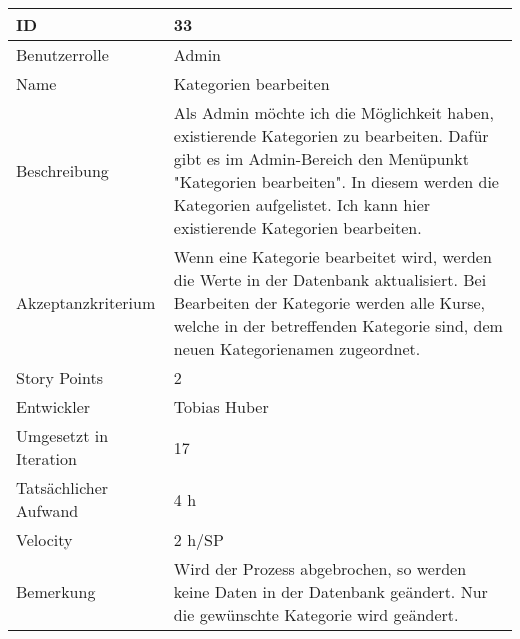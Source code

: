 \begin{tabularx}{\textwidth}{|p{}|X|}
	\hline
	ID & 33 \\
	\hline
	Benutzerrolle & Admin \\
	\hline
	Name & Kategorien bearbeiten\\
	\hline
	Beschreibung & Als Admin möchte ich die Möglichkeit haben, existierende Kategorien zu bearbeiten. Dafür gibt es im Admin-Bereich den Menüpunkt "Kategorien bearbeiten". In diesem werden die Kategorien aufgelistet. Ich kann hier existierende Kategorien bearbeiten. \\
	\hline
	Akzeptanzkriterium & Wenn eine Kategorie bearbeitet wird, werden die Werte in der Datenbank aktualisiert. Bei Bearbeiten der Kategorie werden alle Kurse, welche in der betreffenden Kategorie sind, dem neuen Kategorienamen zugeordnet. \\
	\hline
	Story Points & 2 \\
	\hline
	Entwickler &  Tobias Huber\\
	\hline
	Umgesetzt in Iteration & 17\\
	\hline
	Tatsächlicher Aufwand & 4 h\\
	\hline
	Velocity & 2 h/SP\\
	\hline
	Bemerkung & Wird der Prozess abgebrochen, so werden keine Daten in der Datenbank geändert. Nur die gewünschte Kategorie wird geändert. \\
	\hline
\end{tabularx}
\vspace{20pt}
